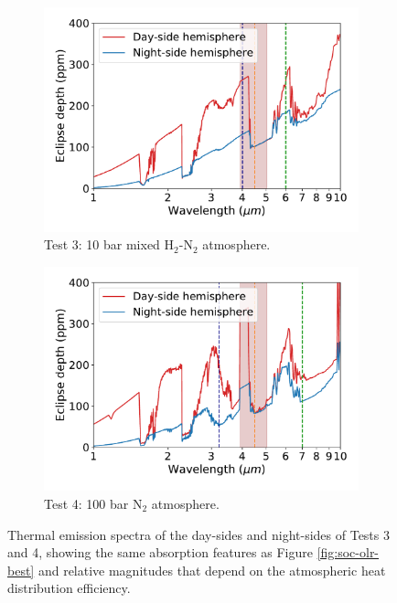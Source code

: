 \begin{figure}
  \centering
  \begin{subfigure}[t]{0.49\textwidth}
    \includegraphics[width=\textwidth]{figures/soc-lava-planets/h2n2-emission-spec.pdf}
    \caption{Test 3: 10 bar mixed H$_{2}$-N$_{2}$ atmosphere.}\label{fig:soc-emission-spec-h2n2}
  \end{subfigure}
  \begin{subfigure}[t]{0.49\textwidth}
    \includegraphics[width=\textwidth]{figures/soc-lava-planets/n2-100bar-emission-spec.pdf}
    \caption{Test 4: 100 bar N$_{2}$ atmosphere.}\label{fig:soc-emission-spec-n2-100bar}
  \end{subfigure}
  \caption{Thermal emission spectra of the day-sides and night-sides of Tests 3 and 4, showing the same absorption features as Figure \ref{fig:soc-olr-best} and relative magnitudes that depend on the atmospheric heat distribution efficiency.}
  \label{fig:soc-emission-spec-best}
\end{figure}

